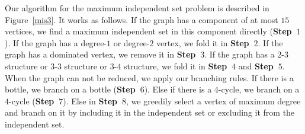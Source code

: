 \documentclass[runningheads]{llncs}
\begin{document}
Our algorithm for the maximum independent set problem is described
in Figure~\ref{mis3}. It works as follows. If the graph has a
component of at most $15$ vertices, we find a maximum independent
set in this component directly (\textbf{Step~$1$}). If the graph
has a degree-$1$ or degree-$2$ vertex, we fold it in
\textbf{Step~$2$}. If the graph has a dominated vertex, we remove
it in \textbf{Step~$3$}. If the graph has a $2$-$3$ structure or
$3$-$3$ structure or $3$-$4$ structure, we fold it in
\textbf{Step~$4$} and \textbf{Step~$5$}. When the graph can not be
reduced, we apply our branching rules. If there is a bottle, we
branch on a bottle (\textbf{Step~$6$}). Else if there is a
$4$-cycle, we branch on a $4$-cycle (\textbf{Step~$7$}). Else in
\textbf{Step~$8$}, we greedily select a vertex of maximum degree
and branch on it by including it in the independent set or
excluding it from the independent set.
\end{document}
